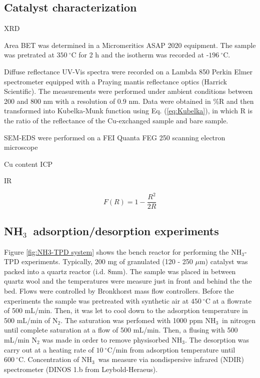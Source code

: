 \documentclass[preprint,12pt]{elsarticle}
\newcommand{\ammonia}{NH$_3$}
\newcommand{\degreeC}[1]{$#1\  ^{\circ}\mathrm{C}$}
\begin{document}


\subsection{Catalyst characterization}
XRD

Area BET was determined in a Micromeritics ASAP 2020 equipment. The sample was pretrated at \degreeC{350} for 2 h and the isotherm was recorded at -\degreeC{196}.

Diffuse reflectance UV-Vis spectra were recorded on a Lambda 850 Perkin Elmer spectrometer equipped with a Praying mantis reflectance optics (Harrick Scientific). The measurements were performed under ambient conditions between 200 and 800 nm with a resolution of 0.9 nm. Data were obtained in \%R and then transformed into Kubelka-Munk function using Eq. (\ref{eq:Kubelka}), in which R is the ratio of the reflectance of the Cu-exchanged sample and bare sample.

SEM-EDS were performed on a FEI Quanta FEG 250 scanning electron microscope

Cu content ICP

IR


\begin{equation}
F(R) = 1 - \frac{R^2}{2R}
\label{eq:Kubelka}
\end{equation}


\subsection{\ammonia\ adsorption/desorption experiments}
Figure \ref{fig:NH3-TPD system} shows the bench reactor for performing the \ammonia-TPD experiments. Typically, 200 mg of granulated (120 - 250 $\mu$m) catalyst was packed into a quartz reactor (i.d. 8mm). The sample was placed in between quartz wool and the temperatures were measure just in front and behind the the bed. Flows were controlled by Bronkhorst mass flow controllers. Before the experiments the sample was pretreated with synthetic air at \degreeC{450} at a flowrate of 500 mL/min. Then, it was let to cool down to the adsorption temperature in 500 mL/min of N$_2$. The saturation was perfomed with 1000 ppm \ammonia\ in nitrogen until complete saturation at a flow of 500 mL/min. Then, a flusing with 500 mL/min N$_2$ was made in order to remove physisorbed \ammonia. The desorption was carry out at a heating rate of \degreeC{10}/min from adsorption temperature until \degreeC{600}. Concentration of \ammonia\ was measure via nondispersive infrared (NDIR) spectrometer (DINOS 1.b from Leybold-Heraeus).
\end{document}
